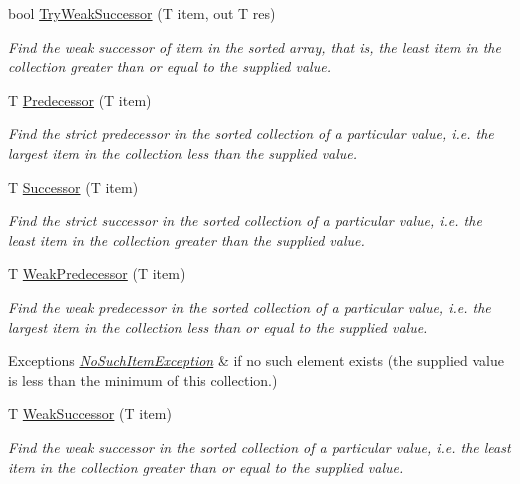 \begin{DoxyCompactItemize}
bool \hyperlink{class_c5_1_1_sorted_array_a9234da9f9e4e5d2922b0447d02372c35}{Try\+Weak\+Successor} (T item, out T res)
\begin{DoxyCompactList}\small\item\em Find the weak successor of item in the sorted array, that is, the least item in the collection greater than or equal to the supplied value. \end{DoxyCompactList}\item 
T \hyperlink{class_c5_1_1_sorted_array_a78cd04c4e73c5ab03b3dcaaf2f9a1811}{Predecessor} (T item)
\begin{DoxyCompactList}\small\item\em Find the strict predecessor in the sorted collection of a particular value, i.\+e. the largest item in the collection less than the supplied value. \end{DoxyCompactList}\item 
T \hyperlink{class_c5_1_1_sorted_array_aaf182a3bcdbb2036f461305d43e4af65}{Successor} (T item)
\begin{DoxyCompactList}\small\item\em Find the strict successor in the sorted collection of a particular value, i.\+e. the least item in the collection greater than the supplied value. \end{DoxyCompactList}\item 
T \hyperlink{class_c5_1_1_sorted_array_a893c217065005c0e4b75ea88df22ced8}{Weak\+Predecessor} (T item)
\begin{DoxyCompactList}\small\item\em Find the weak predecessor in the sorted collection of a particular value, i.\+e. the largest item in the collection less than or equal to the supplied value. 
\begin{DoxyExceptions}{Exceptions}
{\em \hyperlink{class_c5_1_1_no_such_item_exception}{No\+Such\+Item\+Exception}} & if no such element exists (the supplied value is less than the minimum of this collection.) \\
\hline
\end{DoxyExceptions}
\end{DoxyCompactList}\item 
T \hyperlink{class_c5_1_1_sorted_array_a31ed0e58fcef110ab3e62e7e69aebc2e}{Weak\+Successor} (T item)
\begin{DoxyCompactList}\small\item\em Find the weak successor in the sorted collection of a particular value, i.\+e. the least item in the collection greater than or equal to the supplied value. \end{DoxyCompactList}\item 

\end{DoxyCompactItemize}
